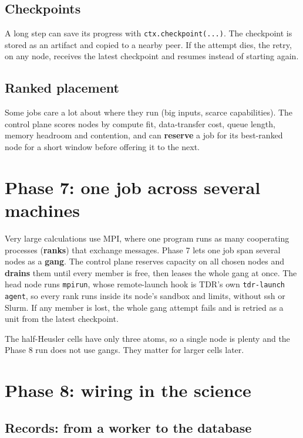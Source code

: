 \documentclass[11pt,a4paper]{report}
\newcommand{\code}[1]{\texttt{#1}}
\begin{document}
\section{Checkpoints}

A long step can save its progress with \code{ctx.checkpoint(...)}. The checkpoint is stored as an
artifact and copied to a nearby peer. If the attempt dies, the retry, on any node, receives the
latest checkpoint and resumes instead of starting again.

\section{Ranked placement}

Some jobs care a lot about where they run (big inputs, scarce capabilities). The control plane
scores nodes by compute fit, data-transfer cost, queue length, memory headroom and contention, and
can \textbf{reserve} a job for its best-ranked node for a short window before offering it to the
next.

\chapter{Phase 7: one job across several machines}

Very large calculations use MPI, where one program runs as many cooperating processes
(\textbf{ranks}) that exchange messages. Phase 7 lets one job span several nodes as a
\textbf{gang}. The control plane reserves capacity on all chosen nodes and \textbf{drains} them until
every member is free, then leases the whole gang at once. The head node runs \code{mpirun}, whose
remote-launch hook is TDR's own \code{tdr-launch agent}, so every rank runs inside its node's
sandbox and limits, without ssh or Slurm. If any member is lost, the whole gang attempt fails and
is retried as a unit from the latest checkpoint.

\begin{inff}
The half-Heusler cells have only three atoms, so a single node is plenty and the Phase 8 run
does not use gangs. They matter for larger cells later.
\end{inff}

\chapter{Phase 8: wiring in the science}

\section{Records: from a worker to the database}
\end{document}
